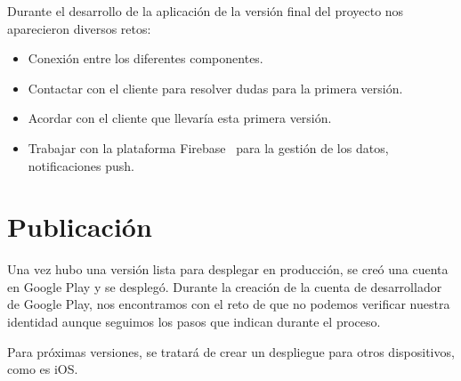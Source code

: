 Durante el desarrollo de la aplicación de la versión final del proyecto nos aparecieron diversos retos:
\begin{itemize}
\item Conexión entre los diferentes componentes.
\item Contactar con el cliente para resolver dudas para la primera versión.
\item Acordar con el cliente que llevaría esta primera versión.
\item Trabajar con la plataforma Firebase~\cite{firebase} para la gestión de los datos, notificaciones push.
\end{itemize}

\section{Publicación}
Una vez hubo una versión lista para desplegar en producción, se creó una cuenta en Google Play y se desplegó.
Durante la creación de la cuenta de desarrollador de Google Play, nos encontramos con el reto de que no podemos verificar nuestra identidad aunque seguimos los pasos que indican durante el proceso. 

Para próximas versiones, se tratará de crear un despliegue para otros dispositivos, como es iOS.



